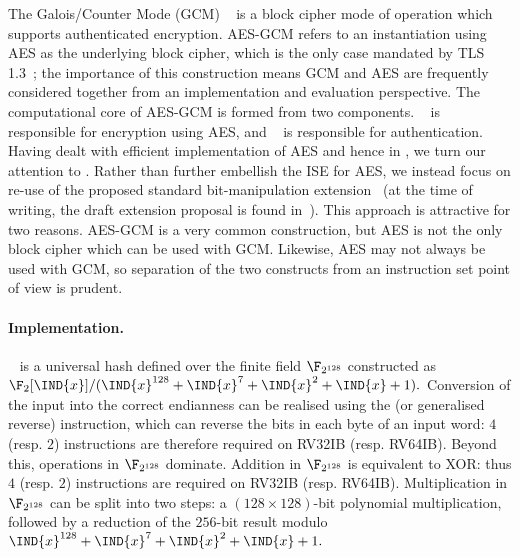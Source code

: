\noindent
The Galois/Counter Mode (GCM) ~\cite{NIST:sp.800.38d}
is a block cipher mode of operation which 
supports authenticated encryption.
AES-GCM refers to an instantiation using AES as the underlying block cipher, 
which is the only case mandated by TLS 1.3~\cite[Section 9.1]{rfc:8446}; the
importance of this construction means GCM and AES are frequently considered 
together from an implementation and evaluation perspective.
The computational core of AES-GCM is formed from two components.
 ~\cite[Section 6.5]{NIST:sp.800.38d}
is responsible for 
    encryption
using AES,
and
~\cite[Section 6.4]{NIST:sp.800.38d}
is responsible for
authentication.
Having dealt with efficient implementation of AES and hence  in
, we turn our attention to .  
Rather than further 
embellish the ISE for AES, we instead focus on re-use of the proposed
standard 
bit-manipulation extension~\cite[Section 17]{RV:ISA:I:19}
(at the time of writing, the draft extension proposal is found in~\cite{riscv:bitmanip:draft}).
This approach is attractive for two reasons.
AES-GCM is a very common construction, but AES is not the only block
cipher which can be used with GCM.
Likewise, AES may not always be used with GCM, so separation of
the two constructs from an instruction set point of view is prudent.


\paragraph{Implementation.}

~\cite[Section 6.4]{NIST:sp.800.38d} is a universal hash defined 
over the finite field $\F_{2^{128}}$ constructed as
$
\F_{2}[\IND{x}] / ( \IND{x}^{128} + \IND{x}^{7} + \IND{x}^{2} + \IND{x} + 1 ) .
$
Conversion of the input into the correct endianness can be realised using
the 
 (or generalised reverse)
instruction,
which can reverse the bits in each byte of an input word:
$4$ (resp. $2$) 
instructions are therefore required on RV32IB (resp. RV64IB).
Beyond this, operations in $\F_{2^{128}}$ dominate.
Addition       in $\F_{2^{128}}$ 
is equivalent to XOR: thus
$4$ (resp. $2$) 
instructions are required on RV32IB (resp. RV64IB).
Multiplication in $\F_{2^{128}}$ 
can be split into two steps:
a $( 128 \times 128 )$-bit polynomial multiplication, 
followed by 
a reduction of the $256$-bit result modulo
$
\IND{x}^{128} + \IND{x}^{7} + \IND{x}^{2} + \IND{x} + 1 .
$

